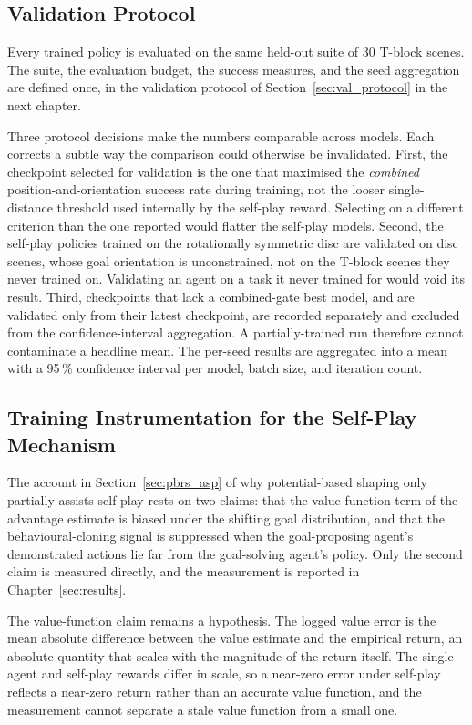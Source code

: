 \subsection{Validation Protocol}
\label{sec:val_protocol_methods}

Every trained policy is evaluated on the same held-out suite of 30 T-block
scenes. The suite, the evaluation budget, the success measures, and the seed
aggregation are defined once, in the validation protocol of
Section~\ref{sec:val_protocol} in the next chapter.

Three protocol decisions make the numbers comparable across models. Each corrects
a subtle way the comparison could otherwise be invalidated. First, the checkpoint
selected for validation is the one that maximised the \emph{combined}
position-and-orientation success rate during training, not the looser
single-distance threshold used internally by the self-play reward. Selecting on a
different criterion than the one reported would flatter the self-play models.
Second, the self-play policies trained on the rotationally symmetric disc are
validated on disc scenes, whose goal orientation is unconstrained, not on the
T-block scenes they never trained on. Validating an agent on a task it never
trained for would void its result. Third, checkpoints that lack a combined-gate
best model, and are validated only from their latest checkpoint, are recorded
separately and excluded from the confidence-interval aggregation. A
partially-trained run therefore cannot contaminate a headline mean. The per-seed
results are aggregated into a mean with a 95\,\% confidence interval per model,
batch size, and iteration count.

\subsection{Training Instrumentation for the Self-Play Mechanism}
\label{sec:instrumentation}

The account in Section~\ref{sec:pbrs_asp} of why potential-based shaping only
partially assists self-play rests on two claims: that the value-function term of
the advantage estimate is biased under the shifting goal distribution, and that
the behavioural-cloning signal is suppressed when the goal-proposing agent's
demonstrated actions lie far from the goal-solving agent's policy. Only the second
claim is measured directly, and the measurement is reported in
Chapter~\ref{sec:results}.

The value-function claim remains a hypothesis. The logged value error is the mean
absolute difference between the value estimate and the empirical return, an
absolute quantity that scales with the magnitude of the return itself. The
single-agent and self-play rewards differ in scale, so a near-zero error under
self-play reflects a near-zero return rather than an accurate value function, and
the measurement cannot separate a stale value function from a small one.

